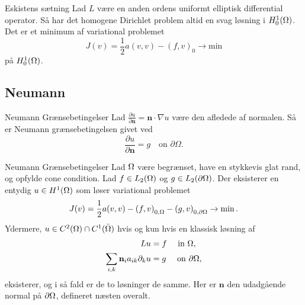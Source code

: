 \begin{frame}{Eskistens sætning}{}
    Lad $L$ være en anden ordens uniformt elliptisk differential operator. Så har det homogene Dirichlet problem altid en svag løsning i $H_0^1(\Omega)$. Det er et minimum af variational problemet
   \begin{equation}
       J(v)=\frac{1}{2} a(v,v) - {(f, v)}_0 \rightarrow \text{min}
   \end{equation}
   på $H_0^1(\Omega)$.
\end{frame}

\subsection{Neumann}
\begin{frame}{Neumann Grænsebetingelser}{}
    Lad $\frac{\partial u}{\partial \mathbf{n}}= \mathbf{n}\cdot \nabla u$ være den afledede af normalen. Så er Neumann grænsebetingelsen givet ved
    \begin{equation}
        \frac{\partial u}{\partial \mathbf{n}}  = g\quad \text{on } \partial \Omega.
    \end{equation}
\end{frame}

\begin{frame}{Neumann Grænsebetingelser}{}
    Lad $\Omega$ være begrænset, have en stykkevis glat rand, og opfylde cone condition. Lad $f \in L_2(\Omega)$ og $g\in L_2(\partial \Omega)$. Der eksisterer en entydig $u \in H^1(\Omega)$ som løser variational problemet
    \begin{equation*}
     J(v) = \frac{1}{2}a(v,v) - {(f,v)}_{0,\Omega} - {(g,v)}_{0,\partial\Omega} \to \min.
    \end{equation*}
    Ydermere, $u \in C^2(\Omega)\cap C^1(\bar{\Omega})$ hvis og kun hvis en klassisk løsning af
    \begin{align}
     Lu &= f \quad \text{ in }\Omega, \nonumber \\
     \sum_{i,k}  \mathbf{n}_i a_{ik} \partial_k u &= g \quad \text{ on } \partial \Omega, \label{eq:neuman_condition_boundary}
    \end{align}
    eksisterer, og i så fald er de to løsninger de samme. Her er $\mathbf{n}$ den udadgående normal på $\partial \Omega$, defineret næsten overalt.
\end{frame}